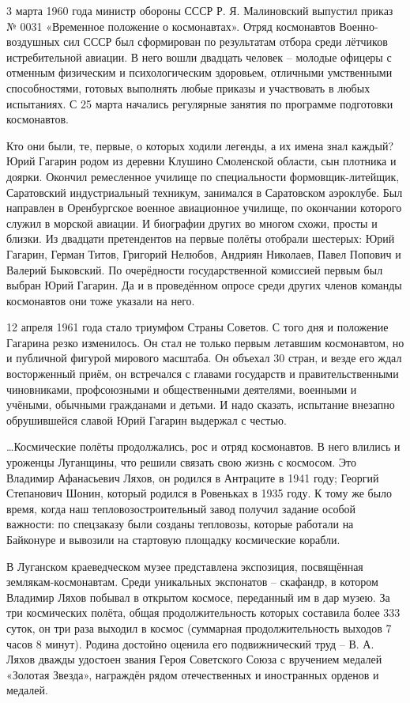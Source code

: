 3 марта 1960 года министр обороны СССР Р. Я. Малиновский выпустил приказ № 0031
«Временное положение о космонавтах». Отряд космонавтов Военно-воздушных сил
СССР был сформирован по результатам отбора среди лётчиков истребительной
авиации. В него вошли двадцать человек – молодые офицеры с отменным физическим
и психологическим здоровьем, отличными умственными способностями, готовых
выполнять любые приказы и участвовать в любых испытаниях. С 25 марта начались
регулярные занятия по программе подготовки космонавтов.

Кто они были, те, первые, о которых ходили легенды, а их имена знал каждый?
Юрий Гагарин родом из деревни Клушино Смоленской области, сын плотника и
доярки. Окончил ремесленное училище по специальности формовщик-литейщик,
Саратовский индустриальный техникум, занимался в Саратовском аэроклубе. Был
направлен в Оренбургское военное авиационное училище, по окончании которого
служил в морской авиации. И биографии других во многом схожи, просты и близки.
Из двадцати претендентов на первые полёты отобрали шестерых: Юрий Гагарин,
Герман Титов, Григорий Нелюбов, Андриян Николаев, Павел Попович и Валерий
Быковский. По очерёдности государственной комиссией первым был выбран Юрий
Гагарин. Да и в проведённом опросе среди других членов команды космонавтов они
тоже указали на него.

12 апреля 1961 года стало триумфом Страны Советов. С того дня и положение
Гагарина резко изменилось. Он стал не только первым летавшим космонавтом, но и
публичной фигурой мирового масштаба. Он объехал 30 стран, и везде его ждал
восторженный приём, он встречался с главами государств и правительственными
чиновниками, профсоюзными и общественными деятелями, военными и учёными,
обычными гражданами и детьми. И надо сказать, испытание внезапно обрушившейся
славой Юрий Гагарин выдержал с честью.

…Космические полёты продолжались, рос и отряд космонавтов. В него влились и
уроженцы Луганщины, что решили связать свою жизнь с космосом. Это Владимир
Афанасьевич Ляхов, он родился в Антраците в 1941 году; Георгий Степанович
Шонин, который родился в Ровеньках в 1935 году. К тому же было время, когда наш
тепловозостроительный завод получил задание особой важности: по спецзаказу были
созданы тепловозы, которые работали на Байконуре и вывозили на стартовую
площадку космические корабли. 

В Луганском краеведческом музее представлена экспозиция, посвящённая
землякам-космонавтам. Среди уникальных экспонатов – скафандр, в котором
Владимир Ляхов побывал в открытом космосе, переданный им в дар музею. За три
космических полёта, общая продолжительность которых составила более 333 суток,
он три раза выходил в космос (суммарная продолжительность выходов 7 часов 8
минут). Родина достойно оценила его подвижнический труд – В. А. Ляхов дважды
удостоен звания Героя Советского Союза с вручением медалей «Золотая Звезда»,
награждён рядом отечественных и иностранных орденов и медалей.

